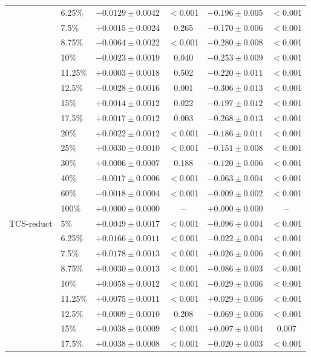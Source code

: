 \begin{tabular}{llcccc}
 & 6.25\% & $-0.0129\pm0.0042$ & $<$0.001 & $-0.196\pm0.005$ & $<$0.001 \\
 & 7.5\% & $+0.0015\pm0.0024$ & 0.265 & $-0.170\pm0.006$ & $<$0.001 \\
 & 8.75\% & $-0.0064\pm0.0022$ & $<$0.001 & $-0.280\pm0.008$ & $<$0.001 \\
 & 10\% & $-0.0023\pm0.0019$ & 0.040 & $-0.253\pm0.009$ & $<$0.001 \\
 & 11.25\% & $+0.0003\pm0.0018$ & 0.502 & $-0.220\pm0.011$ & $<$0.001 \\
 & 12.5\% & $-0.0028\pm0.0016$ & 0.001 & $-0.306\pm0.013$ & $<$0.001 \\
 & 15\% & $+0.0014\pm0.0012$ & 0.022 & $-0.197\pm0.012$ & $<$0.001 \\
 & 17.5\% & $+0.0017\pm0.0012$ & 0.003 & $-0.268\pm0.013$ & $<$0.001 \\
 & 20\% & $+0.0022\pm0.0012$ & $<$0.001 & $-0.186\pm0.011$ & $<$0.001 \\
 & 25\% & $+0.0030\pm0.0010$ & $<$0.001 & $-0.151\pm0.008$ & $<$0.001 \\
 & 30\% & $+0.0006\pm0.0007$ & 0.188 & $-0.120\pm0.006$ & $<$0.001 \\
 & 40\% & $-0.0017\pm0.0006$ & $<$0.001 & $-0.063\pm0.004$ & $<$0.001 \\
 & 60\% & $-0.0018\pm0.0004$ & $<$0.001 & $-0.009\pm0.002$ & $<$0.001 \\
 & 100\% & $+0.0000\pm0.0000$ & -- & $+0.000\pm0.000$ & -- \\
\midrule
TCS-reduct & 5\% & $+0.0049\pm0.0017$ & $<$0.001 & $-0.096\pm0.004$ & $<$0.001 \\
 & 6.25\% & $+0.0166\pm0.0011$ & $<$0.001 & $-0.022\pm0.004$ & $<$0.001 \\
 & 7.5\% & $+0.0178\pm0.0013$ & $<$0.001 & $+0.026\pm0.006$ & $<$0.001 \\
 & 8.75\% & $+0.0030\pm0.0013$ & $<$0.001 & $-0.086\pm0.003$ & $<$0.001 \\
 & 10\% & $+0.0058\pm0.0012$ & $<$0.001 & $-0.029\pm0.006$ & $<$0.001 \\
 & 11.25\% & $+0.0075\pm0.0011$ & $<$0.001 & $+0.029\pm0.006$ & $<$0.001 \\
 & 12.5\% & $+0.0009\pm0.0010$ & 0.208 & $-0.069\pm0.006$ & $<$0.001 \\
 & 15\% & $+0.0038\pm0.0009$ & $<$0.001 & $+0.007\pm0.004$ & 0.007 \\
 & 17.5\% & $+0.0038\pm0.0008$ & $<$0.001 & $-0.020\pm0.003$ & $<$0.001 \\

\end{tabular}
